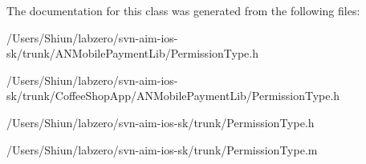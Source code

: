 The documentation for this class was generated from the following files:\begin{DoxyCompactItemize}
\item 
/Users/Shiun/labzero/svn-\/aim-\/ios-\/sk/trunk/ANMobilePaymentLib/PermissionType.h\item 
/Users/Shiun/labzero/svn-\/aim-\/ios-\/sk/trunk/CoffeeShopApp/ANMobilePaymentLib/PermissionType.h\item 
/Users/Shiun/labzero/svn-\/aim-\/ios-\/sk/trunk/PermissionType.h\item 
/Users/Shiun/labzero/svn-\/aim-\/ios-\/sk/trunk/PermissionType.m\end{DoxyCompactItemize}
